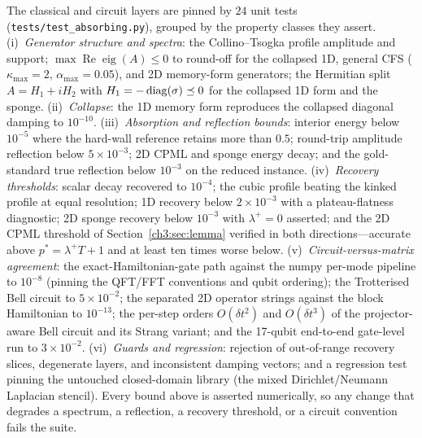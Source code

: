 The classical and circuit layers are pinned by $24$ unit tests
(\texttt{tests/test\_absorbing.py}), grouped by the property classes
they assert.  (i)~\emph{Generator structure and spectra}: the
Collino--Tsogka profile amplitude and support;
$\max\operatorname{Re}\operatorname{eig}(A)\le0$ to round-off for the
collapsed 1D, general CFS ($\kappa_{\max}=2$, $\alpha_{\max}=0.05$),
and 2D memory-form generators; the Hermitian split $A=H_1+iH_2$ with
$H_1=-\operatorname{diag}(\sigma)\preceq0$ for the collapsed 1D form and the sponge.
(ii)~\emph{Collapse}: the 1D memory form reproduces the collapsed
diagonal damping to $10^{-10}$.  (iii)~\emph{Absorption and reflection
bounds}: interior energy below $10^{-5}$ where the hard-wall reference
retains more than $0.5$; round-trip amplitude reflection below
$5\times10^{-3}$; 2D CPML and sponge energy decay; and the
gold-standard true reflection below $10^{-3}$ on the reduced instance.
(iv)~\emph{Recovery thresholds}: scalar decay recovered to $10^{-4}$;
the cubic profile beating the kinked profile at equal resolution; 1D
recovery below $2\times10^{-3}$ with a plateau-flatness diagnostic; 2D
sponge recovery below $10^{-3}$ with $\lambda^{+}=0$ asserted; and the
2D CPML threshold of Section~\ref{ch3:sec:lemma} verified in both
directions---accurate above $p^{*}=\lambda^{+}T+1$ and at least ten
times worse below.  (v)~\emph{Circuit-versus-matrix agreement}: the
exact-Hamiltonian-gate path against the numpy per-mode pipeline to
$10^{-8}$ (pinning the QFT/FFT conventions and qubit ordering); the
Trotterised Bell circuit to $5\times10^{-2}$; the separated 2D operator
strings against the block Hamiltonian to $10^{-13}$; the per-step
orders $O(\delta t^{2})$ and $O(\delta t^{3})$ of the projector-aware
Bell circuit and its Strang variant; and the 17-qubit end-to-end
gate-level run to $3\times10^{-2}$.  (vi)~\emph{Guards and
regression}: rejection of out-of-range recovery slices, degenerate
layers, and inconsistent damping vectors; and a regression test pinning
the untouched closed-domain library (the mixed Dirichlet/Neumann
Laplacian stencil).  Every bound above is asserted numerically, so any
change that degrades a spectrum, a reflection, a recovery threshold, or
a circuit convention fails the suite.
